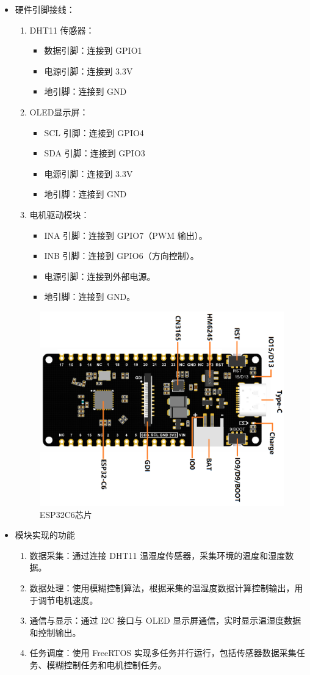 \documentclass[UTF8]{ctexart}
\begin{document}
\begin{itemize}
	\item 硬件引脚接线：
	\begin{enumerate}
		\item DHT11 传感器：
		\begin{itemize}
			\item 数据引脚：连接到 GPIO1
			\item 电源引脚：连接到 3.3V
			\item 地引脚：连接到 GND
		\end{itemize}
		\item OLED显示屏：
		\begin{itemize}
			\item SCL 引脚：连接到 GPIO4
			\item SDA 引脚：连接到 GPIO3
			\item 电源引脚：连接到 3.3V
			\item 地引脚：连接到 GND
		\end{itemize}
		\item 电机驱动模块：
		\begin{itemize}
			\item INA 引脚：连接到 GPIO7（PWM 输出）。
			\item INB 引脚：连接到 GPIO6（方向控制）。
			\item 电源引脚：连接到外部电源。
			\item 地引脚：连接到 GND。
		\end{itemize}
	\end{enumerate}
	\begin{figure}[htbp]
		\centering
		\includegraphics[width=0.42\linewidth]{figure/7}
		\caption{ESP32C6芯片} %
		\label{fig:image1} %
	\end{figure}
	\item 模块实现的功能
	\begin{enumerate}
		\item 数据采集：通过连接 DHT11 温湿度传感器，采集环境的温度和湿度数据。
		\item 数据处理：使用模糊控制算法，根据采集的温湿度数据计算控制输出，用于调节电机速度。
		\item 通信与显示：通过 I2C 接口与 OLED 显示屏通信，实时显示温湿度数据和控制输出。
		\item 任务调度：使用 FreeRTOS 实现多任务并行运行，包括传感器数据采集任务、模糊控制任务和电机控制任务。
	\end{enumerate}
\end{itemize}
\end{document}
